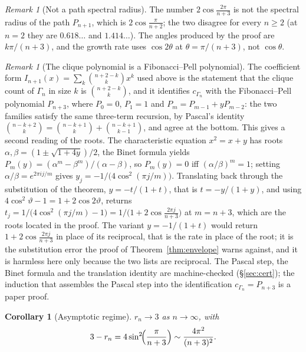 \documentclass[11pt,a4paper]{article}
\newtheorem{corollary}[theorem]{Corollary}
\theoremstyle{definition}
\theoremstyle{remark}
\newtheorem{remark}[theorem]{Remark}
\theoremstyle{plain}
\begin{document}
\begin{remark}[Not a path spectral radius]\label{rem:notpath}
The number $2\cos\frac{2\pi}{n+3}$ is not the spectral radius of the path $P_{n+1}$, which is
$2\cos\frac{\pi}{n+2}$; the two disagree for every $n\ge2$ (at $n=2$ they are $0.618\ldots$ and
$1.414\ldots$). The angles produced by the proof are $k\pi/(n+3)$, and the growth rate uses
$\cos2\theta$ at $\theta=\pi/(n+3)$, not $\cos\theta$.
\end{remark}

\begin{remark}[The clique polynomial is a Fibonacci--Pell polynomial]\label{rem:pell}
The coefficient form $I_{n+1}(x)=\sum_k\binom{n+2-k}{k}x^k$ used above is the statement that the
clique count of $\Gamma_n$ in size $k$ is $\binom{n+2-k}{k}$, and it identifies
$c_{\Gamma_n}$ with the Fibonacci--Pell polynomial $P_{n+3}$, where $P_0=0$, $P_1=1$ and
$P_m=P_{m-1}+yP_{m-2}$: the two families satisfy the same three-term recursion, by Pascal's
identity $\binom{n-k+2}{k}=\binom{n-k+1}{k}+\binom{n-k+1}{k-1}$, and agree at the bottom. This
gives a second reading of the roots. The characteristic equation $x^2=x+y$ has roots
$\alpha,\beta=(1\pm\sqrt{1+4y})/2$, the Binet formula yields
$P_m(y)=(\alpha^m-\beta^m)/(\alpha-\beta)$, so $P_m(y)=0$ iff $(\alpha/\beta)^m=1$; setting
$\alpha/\beta=e^{2\pi ij/m}$ gives $y_j=-1/\bigl(4\cos^2(\pi j/m)\bigr)$. Translating back
through the substitution of the theorem, $y=-t/(1+t)$, that is $t=-y/(1+y)$, and using
$4\cos^2\vartheta-1=1+2\cos2\vartheta$, returns
$t_j=1/\bigl(4\cos^2(\pi j/m)-1\bigr)=1/\bigl(1+2\cos\frac{2\pi j}{n+3}\bigr)$ at $m=n+3$,
which are the roots located in the proof. The variant $y=-1/(1+t)$ would return
$1+2\cos\frac{2\pi j}{n+3}$ in place of its reciprocal, that is the rate in place of the root;
it is the substitution error the proof of Theorem~\ref{thm:envelope} warns against, and it is
harmless here only because the two lists are reciprocal.
The Pascal step, the Binet formula and the translation identity are
machine-checked (\S\ref{sec:cert}); the induction that assembles the Pascal step into the
identification $c_{\Gamma_n}=P_{n+3}$ is a paper proof.
\end{remark}

\begin{corollary}[Asymptotic regime]\label{cor:asymptotic}
$r_n\to3$ as $n\to\infty$, with
\[
3-r_n=4\sin^2\!\Bigl(\frac{\pi}{n+3}\Bigr)\sim\frac{4\pi^2}{(n+3)^2}.
\]
\end{corollary}
\end{document}

